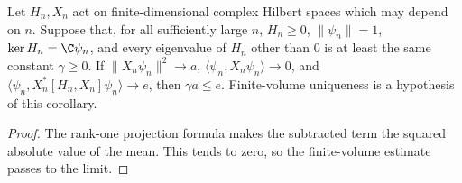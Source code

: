 \begin{corollary}
    \label{cor:commutator_gap_rank_one_limit}
    \leanok
    Let $H_n,X_n$ act on finite-dimensional complex Hilbert spaces which
    may depend on $n$. Suppose that, for all sufficiently large $n$,
    $H_n\geq0$, $\|\psi_n\|=1$, $\ker H_n=\C\psi_n$, and every
    eigenvalue of $H_n$ other than $0$ is at least the same constant
    $\gamma\geq0$. If $\|X_n\psi_n\|^2\to a$,
    $\langle\psi_n,X_n\psi_n\rangle\to0$, and
    $\langle\psi_n,X_n^*[H_n,X_n]\psi_n\rangle\to e$, then
    $\gamma a\leq e$.
    Finite-volume uniqueness is a hypothesis of this corollary.
\end{corollary}
\begin{proof}\leanok
    The rank-one projection formula makes the subtracted term the squared
    absolute value of the mean. This tends to zero, so the finite-volume
    estimate passes to the limit.
\end{proof}

